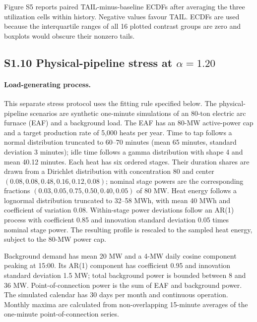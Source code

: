 \documentclass[]{interact}
\begin{document}
Figure S5 reports paired TAIL-minus-baseline ECDFs after averaging the
three utilization cells within history. Negative values favour TAIL.
ECDFs are used because the interquartile ranges of all 16 plotted
contrast groups are zero and boxplots would obscure their nonzero
tails.

\FloatBarrier




\subsection*{S1.10 Physical-pipeline stress at $\alpha=1.20$}

\paragraph*{Load-generating process.}
This separate stress protocol uses the fitting rule specified below.
The physical-pipeline scenarios are synthetic one-minute simulations of
an 80-ton electric arc furnace (EAF) and a background load. The EAF has
an 80-MW active-power cap and a target production rate of 5,000 heats
per year. Time to tap follows a normal distribution truncated to
60--70 minutes (mean 65 minutes, standard deviation 3 minutes); idle
time follows a gamma distribution with shape 4 and mean 40.12 minutes.
Each heat has six ordered stages. Their duration shares are drawn from
a Dirichlet distribution with concentration 80 and center
$(0.08,0.08,0.48,0.16,0.12,0.08)$; nominal stage powers are the
corresponding fractions $(0.03,0.05,0.75,0.50,0.40,0.05)$ of 80 MW.
Heat energy follows a lognormal distribution truncated to 32--58 MWh,
with mean 40 MWh and coefficient of variation 0.08. Within-stage power
deviations follow an AR(1) process with coefficient 0.85 and innovation
standard deviation 0.05 times nominal stage power. The resulting
profile is rescaled to the sampled heat energy, subject to the 80-MW
power cap.

Background demand has mean 20 MW and a 4-MW daily cosine component
peaking at 15:00. Its AR(1) component has coefficient 0.95 and
innovation standard deviation 1.5 MW; total background power is bounded
between 8 and 36 MW. Point-of-connection power is the sum of EAF and
background power. The simulated calendar has 30 days per month and
continuous operation. Monthly maxima are calculated from non-overlapping
15-minute averages of the one-minute point-of-connection series.
\end{document}
